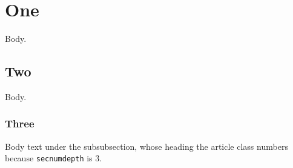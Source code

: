 \documentclass{article}
\begin{document}
\section{One}
Body.

\subsection{Two}
Body.

\subsubsection{Three}
Body text under the subsubsection, whose heading the article class numbers
because \verb!secnumdepth! is 3.
\end{document}
